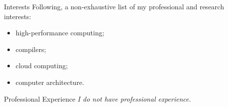 \documentclass{resume}
\begin{document}
\begin{rSection}{Interests}
Following, a non-exhaustive list of my professional and research interests:

\setlength\multicolsep{5pt}
\begin{multicols}{2}
\begin{itemize}[noitemsep]
  \item high-performance computing;
  \item compilers;
  \item cloud computing;
  \item computer architecture.
\end{itemize}
\end{multicols}

\end{rSection}


\begin{rSection}{Professional Experience}
{\it I do not have professional experience.}
\end{rSection}

\end{document}
